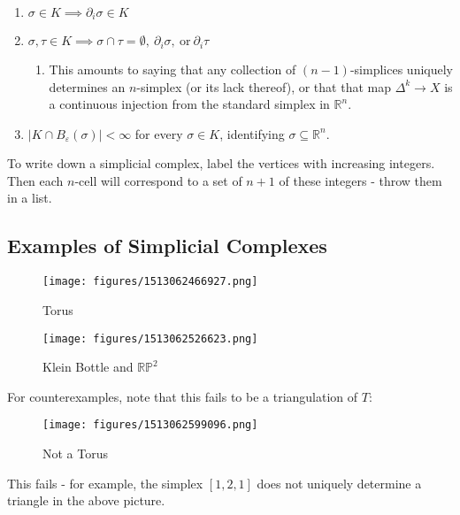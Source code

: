 \begin{enumerate}
\def\labelenumi{\arabic{enumi}.}
\tightlist
\item
  \(\sigma \in K \implies {\partial}_i\sigma \in K\)
\item
  \(\sigma,\tau\in K \implies \sigma\cap\tau = \emptyset,~ {\partial}_i\sigma,~\text{or}~{\partial}_i\tau\)

  \begin{enumerate}
  \def\labelenumii{\arabic{enumii}.}
  \tightlist
  \item
    This amounts to saying that any collection of \((n-1)\)-simplices
    uniquely determines an \(n\)-simplex (or its lack thereof), or that
    that map \(\Delta^k \to X\) is a continuous injection from the
    standard simplex in \({\mathbb{R}}^n\).
  \end{enumerate}
\item
  \({\left\lvert {K\cap B_\varepsilon(\sigma)} \right\rvert} < \infty\)
  for every \(\sigma\in K\), identifying
  \(\sigma \subseteq {\mathbb{R}}^n\).
\end{enumerate}

To write down a simplicial complex, label the vertices with increasing
integers. Then each \(n\)-cell will correspond to a set of \(n+1\) of
these integers - throw them in a list.

\hypertarget{examples-of-simplicial-complexes}{%
\subsection{Examples of Simplicial
Complexes}\label{examples-of-simplicial-complexes}}

\begin{figure}
\centering
\texttt{[image: figures/1513062466927.png]}
\caption{Torus}
\end{figure}

\begin{figure}
\centering
\texttt{[image: figures/1513062526623.png]}
\caption{Klein Bottle and \({\mathbb{RP}}^2\)}
\end{figure}

For counterexamples, note that this fails to be a triangulation of
\(T\):

\begin{figure}
\centering
\texttt{[image: figures/1513062599096.png]}
\caption{Not a Torus}
\end{figure}

This fails - for example, the simplex \([1,2,1]\) does not uniquely
determine a triangle in the above picture.

